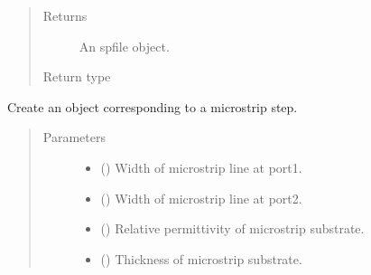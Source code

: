 \documentclass[letterpaper,10pt,english]{sphinxmanual}
\begin{document}
\begin{fulllineitems}
\begin{fulllineitems}
\begin{quote}
\begin{description}
\begin{itemize}
\end{itemize}

\item[{Returns}] \leavevmode
An spfile object.

\item[{Return type}] \leavevmode
{\hyperref[\detokenize{touchstone:touchstone.spfile}]{}}

\end{description}\end{quote}

\end{fulllineitems}


\begin{fulllineitems}
\label{\detokenize{touchstone:touchstone.spfile.microstripstep}}
Create an  object corresponding to a microstrip step.
\begin{quote}\begin{description}
\item[{Parameters}] \leavevmode\begin{itemize}
\item {} 
 () \textendash{} Width of microstrip line at port\sphinxhyphen{}1.

\item {} 
 () \textendash{} Width of microstrip line at port\sphinxhyphen{}2.

\item {} 
 () \textendash{} Relative permittivity of microstrip substrate.

\item {} 
 () \textendash{} Thickness of microstrip substrate.


\end{itemize}
\end{description}
\end{quote}
\end{fulllineitems}
\end{fulllineitems}
\end{document}
